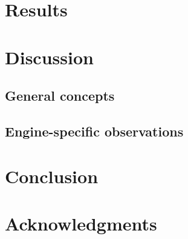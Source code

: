 \documentclass{IEEEtran}
\begin{document}







\section{Results} %



\section{Discussion} %

\subsection{General concepts}






\subsection{Engine-specific observations}

\section{Conclusion} %



\section{Acknowledgments}


 

\end{document}
